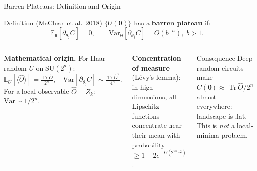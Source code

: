 \documentclass[aspectratio=169,11pt]{beamer}
\newcommand{\btheta}{\boldsymbol{\theta}}
\newcommand{\E}{\mathbb{E}}
\newcommand{\Variance}{\mathrm{Var}}
\newcommand{\Tr}{\operatorname{Tr}}
\begin{document}
\begin{frame}{Barren Plateaus: Definition and Origin}
\small
  \begin{block}{Definition (McClean et al.\ 2018)}
    $\{U(\btheta)\}$ has a \textbf{barren plateau} if:
    \[
      \E_{\btheta}\!\left[\partial_{\theta_j}C\right] = 0,
      \qquad
      \Variance_{\btheta}\!\left[\partial_{\theta_j}C\right]
      = O(b^{-n}),\; b>1.
    \]
  \end{block}

  \begin{columns}[T]
    \textbf{Mathematical origin.}
    For Haar-random $U$ on $\mathrm{SU}(2^n)$:
    \[
      \E_U[\langle\hat{O}\rangle]
      = \tfrac{\Tr\hat{O}}{2^n},\quad
      \Variance[\partial_{\theta_j}C]
      \sim \tfrac{\Tr\hat{O}^2}{4^n}.
    \]
    For a local observable $\hat{O}=Z_k$:
    $\Variance \sim 1/2^n$.

    \textbf{Concentration of measure} (L\'evy's lemma):
    in high dimensions, all Lipschitz functions
    concentrate near their mean with probability
    $\geq 1 - 2e^{-\Omega(2^{2n}\varepsilon^2)}$.

    \begin{alertblock}{Consequence}
      Deep random circuits make $C(\btheta)\approx\Tr\hat{O}/2^n$
      almost everywhere: landscape is flat.
      This is \emph{not} a local-minima problem.
    \end{alertblock}
  \end{columns}
\end{frame}
\end{document}
